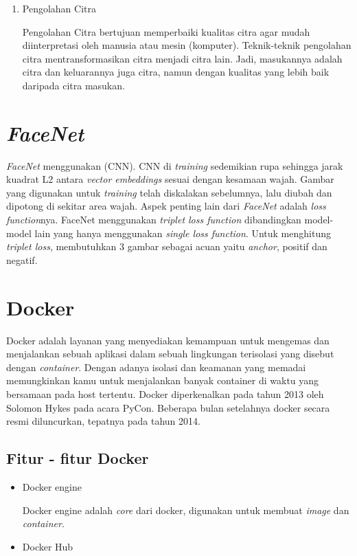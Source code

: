 {{\begin{enumerate}
  \item Pengolahan Citra
    
  Pengolahan Citra bertujuan memperbaiki kualitas citra agar
  mudah diinterpretasi oleh manusia atau mesin (komputer).
  Teknik-teknik pengolahan citra mentransformasikan citra menjadi citra lain. Jadi, masukannya adalah citra dan keluarannya
  juga citra, namun dengan kualitas yang lebih baik daripada
  citra masukan.
\end{enumerate}

\section{\textit{FaceNet}}
\textit{FaceNet} menggunakan (CNN). CNN di \textit{training} sedemikian rupa sehingga jarak kuadrat L2 antara \textit{vector embeddings} sesuai dengan kesamaan wajah.
Gambar yang digunakan untuk \textit{training} telah diskalakan sebelumnya, lalu diubah dan dipotong di sekitar area wajah.
Aspek penting lain dari \textit{FaceNet} adalah \textit{loss function}nya. FaceNet menggunakan \textit{triplet loss function} dibandingkan model-model lain yang hanya menggunakan \textit{single loss function}.
Untuk menghitung \textit{triplet loss}, membutuhkan 3 gambar sebagai acuan yaitu \textit{anchor}, positif dan negatif\citep{Facenet2015}.

\section{Docker}
Docker adalah layanan yang menyediakan kemampuan untuk mengemas dan menjalankan sebuah aplikasi dalam sebuah lingkungan terisolasi yang disebut dengan \textit{container}.
Dengan adanya isolasi dan keamanan yang memadai memungkinkan kamu untuk menjalankan banyak container di waktu yang bersamaan pada host tertentu.
Docker diperkenalkan pada tahun 2013 oleh Solomon Hykes pada acara PyCon. Beberapa bulan setelahnya docker secara resmi diluncurkan, tepatnya pada tahun 2014.
\subsection{Fitur - fitur Docker}
\begin{itemize}
  \item Docker engine
  
  Docker engine adalah \textit{core} dari docker, digunakan untuk membuat \textit{image} dan \textit{container}.

  \item Docker Hub
  

\end{itemize}}}
